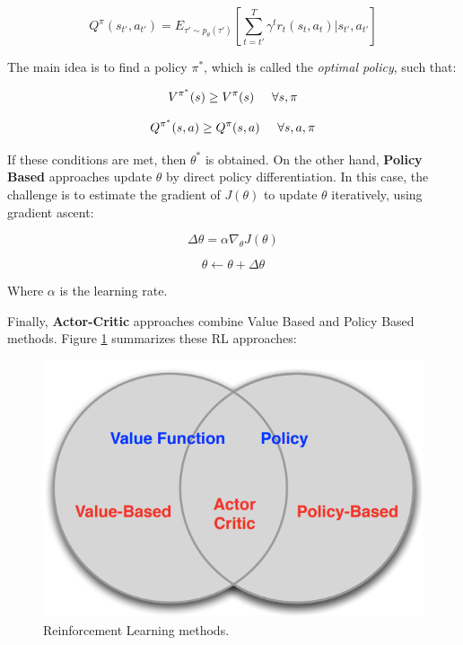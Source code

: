 \begin{equation}
    Q^{\pi}(s_{t'}, a_{t'})  = E_{\tau' \sim p_{\theta}(\tau')}\left[\sum_{t=t'}^{T}\gamma^{t}r_{t}(s_{t}, a_{t})|s_{t'},a_{t'}\right]
\end{equation}

The main idea is to find a policy $\pi^{*}$, which is called the \emph{optimal policy}, such that:

\begin{equation}
    V^{\pi^{*}}(s) \geq V^{\pi}(s) \hspace{0.5cm} \forall s, \pi
\end{equation}

\begin{equation}
    Q^{\pi^{*}}(s,a) \geq Q^{\pi}(s,a) \hspace{0.5cm} \forall s,a,\pi
\end{equation}

If these conditions are met, then $\theta^{*}$ is obtained. On the other hand, \textbf{Policy Based} approaches update $\theta$ by direct policy differentiation. In this case, the challenge is to estimate the gradient of $J(\theta)$ to update $\theta$ iteratively, using gradient ascent:

\begin{equation}
    \Delta \theta = \alpha \nabla_{\theta}J(\theta)
\end{equation}

\begin{equation}
    \theta \leftarrow \theta + \Delta \theta
\end{equation}

Where $\alpha$ is the learning rate.

Finally, \textbf{Actor-Critic} approaches combine Value Based and Policy Based methods. Figure \ref{fig:rl_summ} summarizes these RL approaches:

\begin{figure}[h]
    \centering
    \includegraphics[width=0.5\linewidth]{imagenes/cap1/rl_summary.png}
    \caption{Reinforcement Learning methods.}
    \label{fig:rl_summ}
\end{figure}

